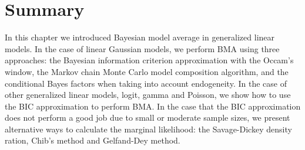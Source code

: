     

\section{Summary}\label{sec10_5}
In this chapter we introduced Bayesian model average in generalized linear models. In the case of linear Gaussian models, we perform BMA using three approaches: the Bayesian information criterion approximation with the Occam's window, the Markov chain Monte Carlo model composition algorithm, and the conditional Bayes factors when taking into account endogeneity. In the case of other generalized linear models, logit, gamma and Poisson, we show how to use the BIC approximation to perform BMA. In the case that the BIC approximation does not perform a good job due to small or moderate sample sizes, we present alternative ways to calculate the marginal likelihood: the Savage-Dickey density ration, Chib's method and Gelfand-Dey method.  

